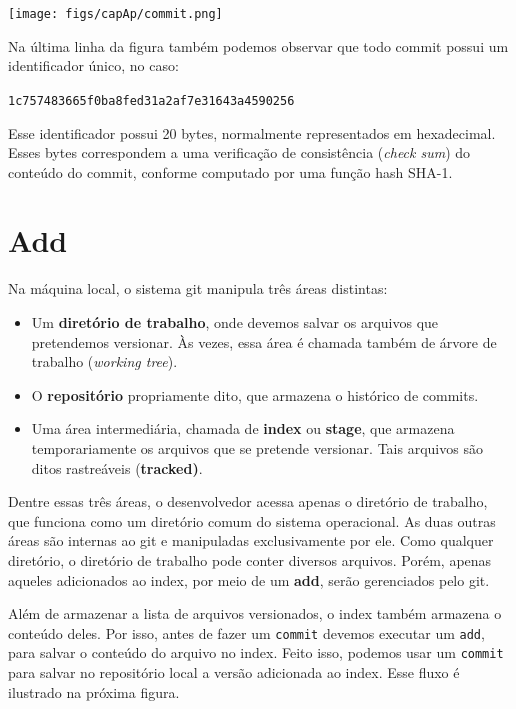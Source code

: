 \documentclass[
  11pt,
  twoside]{book}
\newcommand{\passthrough}[1]{#1}
\let\origfigure\figure
\let\endorigfigure\endfigure
\renewenvironment{figure}[1][2] {
    \expandafter\origfigure\expandafter[!h]
} {
    \endorigfigure
}
\begin{document}
\begin{figure}
\centering
\texttt{[image: figs/capAp/commit.png]}
\caption{Commit no GitHub}
\end{figure}

Na última linha da figura também podemos observar que todo commit possui
um identificador único, no caso:

\passthrough{\lstinline!1c757483665f0ba8fed31a2af7e31643a4590256!}

Esse identificador possui 20 bytes, normalmente representados em
hexadecimal. Esses bytes correspondem a uma verificação de consistência
(\emph{check sum}) do conteúdo do commit, conforme computado por uma
função hash SHA-1.

\hypertarget{add}{%
\section{Add}\label{add}}


Na máquina local, o sistema git manipula três áreas distintas:

\begin{itemize}
\item
  Um \textbf{diretório de trabalho}, 
  onde devemos salvar os arquivos que pretendemos versionar. Às vezes,
  essa área é chamada também de árvore de trabalho (\emph{working
  tree}).
\item
  O \textbf{repositório} propriamente dito, que armazena o histórico de
  commits.
\item
  Uma área intermediária, chamada de \textbf{index} ou \textbf{stage},
  que  
   armazena temporariamente os arquivos
  que se pretende versionar. Tais arquivos são ditos rastreáveis
  (\textbf{tracked)}.
\end{itemize}

Dentre essas três áreas, o desenvolvedor acessa apenas o diretório de
trabalho, que funciona como um diretório comum do sistema operacional.
As duas outras áreas são internas ao git e manipuladas exclusivamente
por ele. Como qualquer diretório, o diretório de trabalho pode conter
diversos arquivos. Porém, apenas aqueles adicionados ao index, por meio
de um \textbf{add}, serão gerenciados pelo git.

Além de armazenar a lista de arquivos versionados, o index também
armazena o conteúdo deles. Por isso, antes de fazer um
\passthrough{\lstinline!commit!} devemos executar um
\passthrough{\lstinline!add!}, para salvar o conteúdo do arquivo no
index. Feito isso, podemos usar um \passthrough{\lstinline!commit!} para
salvar no repositório local a versão adicionada ao index. Esse fluxo é
ilustrado na próxima figura.
\end{document}
